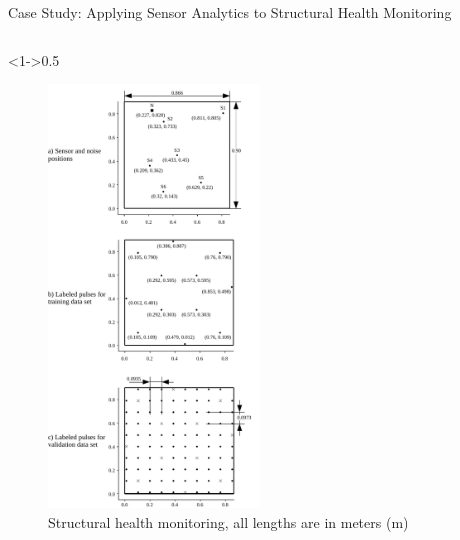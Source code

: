 \begin{frame}{Case Study: Applying Sensor Analytics to Structural Health Monitoring}
	\begin{columns}[t] %
		
		\begin{column}<1->{0.5\textwidth}\centering
			\begin{figure}
				\includegraphics[width=0.5\textwidth]{../chapters/cnn_accelerator/figures/histograms/data_set.pdf} %
				\caption{ Structural health monitoring, all lengths are in meters (m)}
			\end{figure}
		\end{column}
		

\end{columns}
\end{frame}
